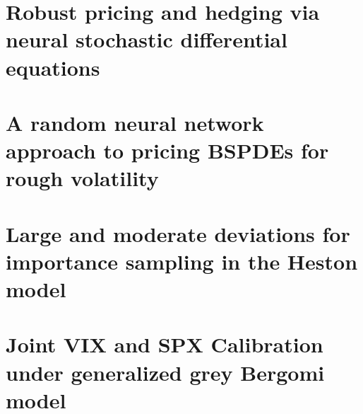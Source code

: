 \chapter[Robust pricing and hedging via neural SDEs]{Robust pricing and hedging via neural stochastic differential equations}


\chapter[Random neural networks for rough volatility BSPDEs]{A random neural network approach to pricing BSPDEs for rough volatility}


\chapter[Large and moderate deviations for importance sampling]{Large and moderate deviations for importance sampling in the Heston model}


\chapter[Joint VIX and SPX Calibration under ggBergomi]{Joint VIX and SPX Calibration under generalized grey Bergomi model}
